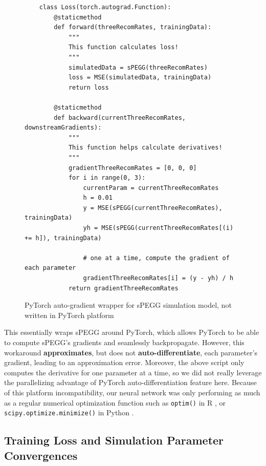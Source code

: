\documentclass[12pt]{article}
\begin{document}
\begin{figure}[h]
    \centering
    \begin{lstlisting}
    class Loss(torch.autograd.Function):
        @staticmethod
        def forward(threeRecomRates, trainingData):
            """
            This function calculates loss!
            """
            simulatedData = sPEGG(threeRecomRates)
            loss = MSE(simulatedData, trainingData)
            return loss
        
        @staticmethod
        def backward(currentThreeRecomRates, downstreamGradients):
            """
            This function helps calculate derivatives!
            """
            gradientThreeRecomRates = [0, 0, 0]
            for i in range(0, 3):
                currentParam = currentThreeRecomRates
                h = 0.01
                y = MSE(sPEGG(currentThreeRecomRates), trainingData)
                yh = MSE(sPEGG(currentThreeRecomRates[(i) += h]), trainingData)
                
                # one at a time, compute the gradient of each parameter
                gradientThreeRecomRates[i] = (y - yh) / h
            return gradientThreeRecomRates

    \end{lstlisting}
    \vspace{0.6em}
    \caption{PyTorch auto-gradient wrapper for sPEGG simulation model, not written in PyTorch platform}
    \label{code:autogradwrapper}
\end{figure}

This essentially wraps sPEGG around PyTorch, which allows PyTorch to be able to compute sPEGG's gradients and seamlessly backpropagate. However, this workaround \textbf{approximates}, but does not \textbf{auto-differentiate}, each parameter's gradient, leading to an approximation error. Moreover, the above script only computes the derivative for one parameter at a time, so we did not really leverage the parallelizing advantage of PyTorch auto-differentiation feature here. Because of this platform incompatibility, our neural network was only performing as much as a regular numerical optimization function such as \texttt{optim()} in R \cite{r2024}, or \texttt{scipy.optimize.minimize()} in Python \cite{scipy2020}.

\subsection{Training Loss and Simulation Parameter Convergences}
\end{document}
